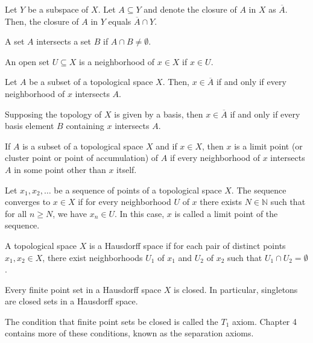 \documentclass{article}
\begin{document}
\medskip{}

    Let $Y$ be a subspace of $X$. Let $A \subseteq Y$ and denote the closure of $A$ in $X$ as $\overline A$. Then, the closure of $A$ in $Y$ equals $\overline A \cap Y$.

\medskip{}

    A set $A$ intersects a set $B$ if $A \cap B \neq \emptyset$.

\medskip{}

    An open set $U \subseteq X$ is a neighborhood of $x \in X$ if $x \in U$.

\medskip{}

    Let $A$ be a subset of a topological space $X$.
    Then, $x \in \overline A$ if and only if every neighborhood of $x$ intersects $A$.

    Supposing the topology of $X$ is given by a basis, then $x \in \overline A$ if and only if every basis element $B$ containing $x$ intersects $A$.

\medskip{}

    If $A$ is a subset of a topological space $X$ and if $x \in X$, then $x$ is a limit point (or cluster point or point of accumulation) of $A$ if every neighborhood of $x$ intersects $A$ in some point other than $x$ itself.

\medskip{}

    Let $x_1, x_2, \hdots$ be a sequence of points of a topological space $X$.
    The sequence converges to $x \in X$ if for every neighborhood $U$ of $x$ there exists $N \in \mathbb N$ such that for all $n \geq N$, we have $x_n \in U$. 
    In this case, $x$ is called a limit point of the sequence.

\medskip{}

    A topological space $X$ is a Hausdorff space if for each pair of distinct points $x_1, x_2 \in X$, there exist neighborhoods $U_1$ of $x_1$ and $U_2$ of $x_2$ such that $U_1 \cap U_2 = \emptyset$.

\medskip{}

    Every finite point set in a Hausdorff space $X$ is closed. In particular, singletons are closed sets in a Hausdorff space.

\medskip{}

    The condition that finite point sets be closed is called the $T_1$ axiom. Chapter 4 contains more of these conditions, known as the separation axioms.
\end{document}
